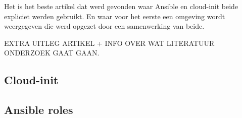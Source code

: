 Het is het beste artikel dat werd gevonden waar Ansible en cloud-init beide expliciet werden gebruikt. En waar voor het eerste een omgeving wordt weergegeven die werd opgezet door een samenwerking van beide.

EXTRA UITLEG ARTIKEL + INFO OVER WAT LITERATUUR ONDERZOEK GAAT GAAN.
\subsection{Cloud-init}

\subsection{Ansible roles}

